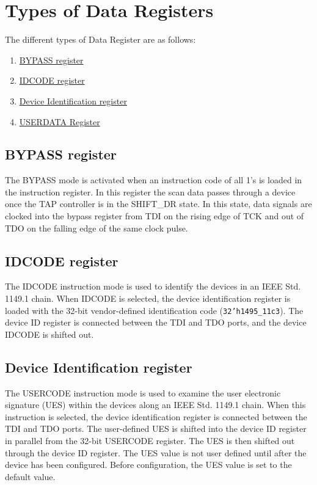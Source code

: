 \section{Types of Data Registers}
\label{sec:data-regs-types}

The different types of Data Register are as follows:
\begin{enumerate}
    \item \hyperref[subsec:bypass-reg]{BYPASS register}
    \item \hyperref[subsec:idcode-reg]{IDCODE register}
    \item \hyperref[subsec:device-id-reg]{Device Identification register}
    \item \hyperref[subsec:userdata-reg]{USERDATA Register}
\end{enumerate}

\subsection{BYPASS register}
\label{subsec:bypass-reg}
The BYPASS mode is activated when an instruction code of all 1’s is loaded in the instruction register. In this register the scan data passes through a device once the TAP controller is in the SHIFT\_DR state. In this state, data signals are clocked into the bypass register from TDI on the rising edge of TCK and out of TDO on the falling edge of the same clock pulse.

\subsection{IDCODE register}
\label{subsec:idcode-reg}
The IDCODE instruction mode is used to identify the devices in an IEEE Std. 1149.1 chain. When IDCODE is selected, the device identification register is loaded with the 32-bit vendor-defined identification code (\texttt{32'h1495\_11c3}). The device ID register is connected between the TDI and TDO ports, and the device IDCODE is shifted out.

\subsection{Device Identification register}
\label{subsec:device-id-reg}
The USERCODE instruction mode is used to examine the user electronic signature (UES) within the devices along an IEEE Std. 1149.1 chain. When this instruction is selected, the device identification register is connected between the TDI and TDO ports. The user-defined UES is shifted into the device ID register in parallel from the 32-bit USERCODE register. The UES is then shifted out through the device ID register. The UES value is not user defined until after the device has been configured. Before configuration, the UES value is set to the default value.

